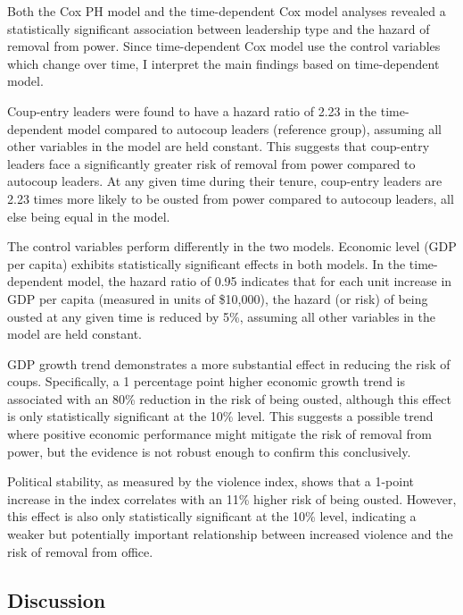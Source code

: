 \documentclass[
  12pt,
]{report}
\begin{document}
Both the Cox PH model and the time-dependent Cox model analyses revealed
a statistically significant association between leadership type and the
hazard of removal from power. Since time-dependent Cox model use the
control variables which change over time, I interpret the main findings
based on time-dependent model.

Coup-entry leaders were found to have a hazard ratio of 2.23 in the
time-dependent model compared to autocoup leaders (reference group),
assuming all other variables in the model are held constant. This
suggests that coup-entry leaders face a significantly greater risk of
removal from power compared to autocoup leaders. At any given time
during their tenure, coup-entry leaders are 2.23 times more likely to be
ousted from power compared to autocoup leaders, all else being equal in
the model.

The control variables perform differently in the two models. Economic
level (GDP per capita) exhibits statistically significant effects in
both models. In the time-dependent model, the hazard ratio of 0.95
indicates that for each unit increase in GDP per capita (measured in
units of \$10,000), the hazard (or risk) of being ousted at any given
time is reduced by 5\%, assuming all other variables in the model are
held constant.

GDP growth trend demonstrates a more substantial effect in reducing the
risk of coups. Specifically, a 1 percentage point higher economic growth
trend is associated with an 80\% reduction in the risk of being ousted,
although this effect is only statistically significant at the 10\%
level. This suggests a possible trend where positive economic
performance might mitigate the risk of removal from power, but the
evidence is not robust enough to confirm this conclusively.

Political stability, as measured by the violence index, shows that a
1-point increase in the index correlates with an 11\% higher risk of
being ousted. However, this effect is also only statistically
significant at the 10\% level, indicating a weaker but potentially
important relationship between increased violence and the risk of
removal from office.

\subsection{Discussion}\label{discussion}
\end{document}
